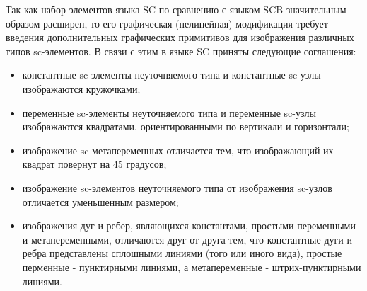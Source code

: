 Так как набор элементов языка SC по сравнению с языком SCB значительным образом расширен, то
его графическая (нелинейная) модификация требует введения дополнительных графических
примитивов для изображения различных типов sc-элементов. В связи с этим в языке SC приняты
следующие соглашения: 
\begin{itemize}
    \item константные sc-элементы неуточняемого типа и константные sc-узлы изображаются кружочками;
    \item переменные sc-элементы неуточняемого типа и переменные sc-узлы изображаются квадратами, ориентированными по вертикали и горизонтали;
    \item изображение sc-метапеременных отличается тем, что изображающий их квадрат повернут на 45 градусов;
    \item изображение sc-элементов неуточняемого типа от изображения sc-узлов отличается уменьшенным размером;
    \item изображения дуг и ребер, являющихся константами, простыми переменными и метапеременными, отличаются друг от друга тем, что константные дуги и ребра представлены сплошными линиями (того или иного вида), простые перменные - пунктирными линиями, а метапеременные - штрих-пунктирными линиями.
\end{itemize}

